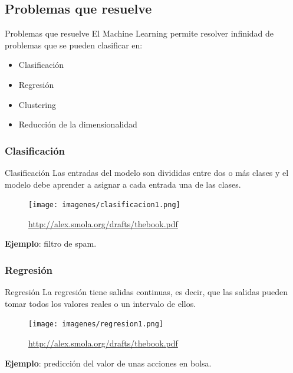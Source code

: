 \documentclass[hyperref={unicode}]{beamer}
\begin{document}
\subsection{Problemas que resuelve}
\begin{frame}{Problemas que resuelve}
El Machine Learning permite resolver infinidad de problemas que se pueden clasificar en:\\

\begin{itemize}
\item Clasificación
\item Regresión
\item Clustering
\item Reducción de la dimensionalidad
\end{itemize}
\end{frame}

\subsubsection{Clasificación}
\begin{frame}{Clasificación}
	Las entradas del modelo son divididas entre dos o más clases y el modelo debe aprender a asignar a cada entrada una de las clases. 
	\begin{figure}
		\begin{center}
		\texttt{[image: imagenes/clasificacion1.png]}
		\caption{\url{http://alex.smola.org/drafts/thebook.pdf}}
		\end{center}
	\end{figure}
	
	\textbf{Ejemplo}: filtro de spam.  
\end{frame}

\subsubsection{Regresión}
\begin{frame}{Regresión}
	La regresión tiene salidas continuas, es decir, que las salidas pueden tomar todos los valores reales o un intervalo de ellos. 
		\begin{figure}
				\begin{center}
				\texttt{[image: imagenes/regresion1.png]}
				\caption{\url{http://alex.smola.org/drafts/thebook.pdf}}
				\end{center}
		\end{figure}
		
		\textbf{Ejemplo}: predicción del valor de unas acciones en bolsa. 
\end{frame}
\end{document}
